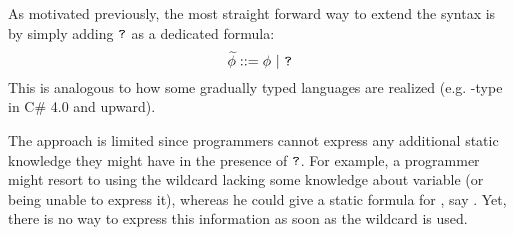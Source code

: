 As motivated previously, the most straight forward way to extend the syntax is by simply adding $\textup{\texttt{?}}$ as a dedicated formula:
\begin{displaymath}
\widetilde{\phi} ::= \phi ~|~ \textup{\texttt{?}}
\end{displaymath}
This is analogous to how some gradually typed languages are realized (e.g. -type in C\# 4.0 and upward).


The approach is limited since programmers cannot express any additional static knowledge they might have in the presence of $\textup{\texttt{?}}$.
For example, a programmer might resort to using the wildcard lacking some knowledge about variable  (or being unable to express it), whereas he could give a static formula for , say .
Yet, there is no way to express this information as soon as the wildcard is used.